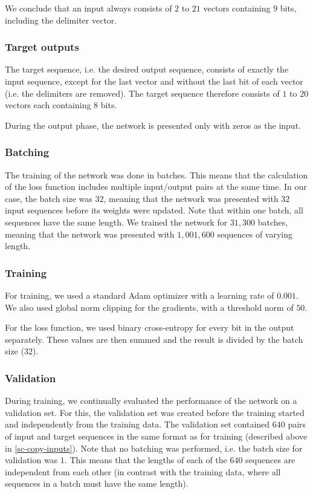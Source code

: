 \documentclass[12pt,twoside]{article}
\theoremstyle{plain}
\theoremstyle{definition}
\theoremstyle{remark}
\begin{document}
We conclude that an input always consists of $2$ to $21$ vectors containing $9$ bits, including the delimiter vector.

\subsubsection{Target outputs}
The target sequence, i.e. the desired output sequence, consists of exactly the input sequence, except for the last vector and without the last bit of each vector (i.e. the delimiters are removed). The target sequence therefore consists of $1$ to $20$ vectors each containing $8$ bits.

During the output phase, the network is presented only with zeros as the input.

\subsubsection{Batching}
The training of the network was done in batches. This means that the calculation of the loss function includes multiple input/output pairs at the same time. In our case, the batch size was $32$, meaning that the network was presented with $32$ input sequences before its weights were updated. Note that within one batch, all sequences have the same length. We trained the network for $31,300$ batches, meaning that the network was presented with $1,001,600$ sequences of varying length.

\subsubsection{Training}
For training, we used a standard Adam optimizer with a learning rate of $0.001$. We also used global norm clipping \cite{global-norm-clipping} for the gradients, with a threshold norm of $50$.

For the loss function, we used binary cross-entropy for every bit in the output separately. These values are then summed and the result is divided by the batch size ($32$).

\subsubsection{Validation}
During training, we continually evaluated the performance of the network on a validation set. For this, the validation set was created before the training started and independently from the training data. The validation set contained $640$ pairs of input and target sequences in the same format as for training (described above in \autoref{sc-copy-inputs}). Note that no batching was performed, i.e. the batch size for validation was $1$. This means that the lengths of each of the $640$ sequences are independent from each other (in contrast with the training data, where all sequences in a batch must have the same length).
\end{document}
